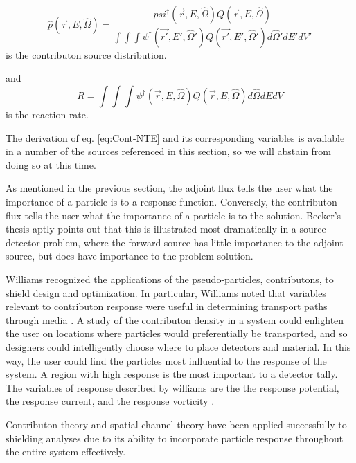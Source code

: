 \begin{equation}
\hat p(\vec{r}, E, \hat\Omega) =
\frac{psi^{\dagger}(\vec{r}, E, \hat\Omega) Q(\vec{r},E,\hat\Omega)}
     {\int \int \int \psi^{\dagger}(\vec{r'},E',\hat\Omega')
     Q(\vec{r'},E',\hat\Omega') d\hat\Omega' dE' dV'}
\end{equation}
is the contributon source distribution.

and
\begin{equation}
R = \int \int \int \psi^{\dagger}(\vec{r},E,\hat\Omega)Q(\vec{r},E,\hat\Omega)
    d\hat\Omega dE dV
\end{equation}
is the reaction rate.


The derivation of eq. \ref{eq:Cont-NTE} and its corresponding variables is
available in a number of the sources referenced in this section, so we will
abstain from doing so at this time.

As mentioned in the previous section, the adjoint flux tells the user what the
importance of a particle is to a response function. Conversely, the contributon
flux tells the user what the importance of a particle is to the solution.
Becker's thesis \cite{becker_hybrid_2009} aptly points out that this is
illustrated most dramatically in a source-detector problem, where the forward
source has little importance to the adjoint source, but does have importance to
the problem solution.

Williams recognized the applications of the pseudo-particles, contributons, to
shield design and optimization. In particular, Williams noted that variables
relevant to contributon response were useful in determining transport paths
through media \cite{williams_contributon_study, williams_SCC_shielding}. A study
of the contributon density in a system could enlighten the user on locations
where particles would preferentially be transported, and so designers could
intelligently choose where to place detectors and material. In this way, the
user could find the particles most influential to the response of the system. A
region with high response is the most important to a detector tally. The
variables of response described by williams are the the response potential, the
response current, and the response vorticity \cite{williams_contributorn_1992}.

Contributon theory and spatial channel theory have been applied successfully to
shielding analyses \cite{seydaliev_contributon_2008, williams_SCC_shielding} due
to its ability to incorporate particle response throughout the entire system
effectively.

